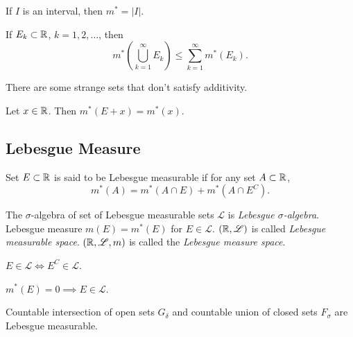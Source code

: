 \documentclass[class=book, crop=false]{standalone}
\begin{document}
        \begin{theorem}
            If $I$ is an interval, then $m^* = |I|$.
        \end{theorem}

        \begin{theorem}[Subadditivity]
            If $E_k \subset \mathbb{R}$, $k = 1, 2, \dots$, then
            \begin{equation*}
                m^*\left(\bigcup^{\infty}_{k = 1} E_k\right) \leq \sum^{\infty}_{k = 1} m^*(E_k).
            \end{equation*}
        \end{theorem}
        \begin{remark}
            There are some strange sets that don't satisfy additivity.
        \end{remark}

        \begin{theorem}
            Let $x \in \mathbb{R}$. Then $m^*(E + x) = m^*(x)$.
        \end{theorem}

        \subsection{Lebesgue Measure}
        \begin{definition}
            Set $E \subset \mathbb{R}$ is said to be Lebesgue measurable if for any set $A \subset \mathbb{R}$,
            \begin{equation*}
                m^*(A) = m^*(A \cap E) + m^*(A \cap E^C).
            \end{equation*}
        \end{definition}

        \begin{definition}
            The $\sigma$-algebra of set of Lebesgue measurable sets $\mathscr{L}$ is \textit{Lebesgue $\sigma$-algebra}. Lebesgue measure $m(E) = m^*(E)$ for $E \in \mathscr{L}$. $(\mathbb{R}, \mathscr{L})$ is called \textit{Lebesgue measurable space}. $(\mathbb{R}, \mathscr{L}, m)$ is called the \textit{Lebesgue measure space}.
        \end{definition}
        
        \begin{theorem}
            $E \in \mathscr{L} \Leftrightarrow E^C \in \mathscr{L}$.
        \end{theorem}

        \begin{theorem}
            $m^*(E) = 0 \implies E \in \mathscr{L}$.
        \end{theorem}
        \begin{remark}
            Countable intersection of open sets $G_{\delta}$ and countable union of closed sets $F_{\sigma}$ are Lebesgue measurable.
        \end{remark}
\end{document}

